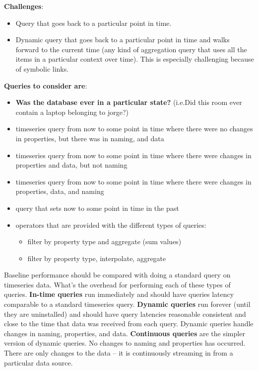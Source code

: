 {\bf Challenges}:
\begin{itemize}
\item Query that goes back to a particular point in time.
\item Dynamic query that goes back to a particular point in time and walks forward to the current time (any kind of aggregation
query that uses all the items in a particular context over time).  This is especially challenging because of symbolic links.\\
\end{itemize}


{\bf Queries to consider are}:
\begin{itemize}

\item {\bf Was the database ever in a particular state?} (i.e.Did this room ever contain a laptop belonging to jorge?)
\item timeseries query from now to some point in time where there were no changes in properties, but there was in naming, and data
\item timeseries query from now to some point in time where there were changes in properties and data, but not naming
\item timeseries query from now to some point in time where there were changes in properties, data, and naming
\item query that sets now to some point in time in the past
\item operators that are provided with the different types of queries:
	\begin{itemize}
	\item filter by property type and aggregate (sum values)
	\item filter by property type, interpolate, aggregate\\
	\end{itemize}
\end{itemize}

Baseline performance should be compared with doing a standard query on timeseries data.  What's the overhead for performing
each of these types of queries.  {\bf In-time queries} run immediately and should have queries latency comparable to a standard
timeseries query.  {\bf Dynamic queries} run forever (until they are uninstalled) and should have query latencies reasonable consistent
and close to the time that data was received from each query.  Dynamic queries handle changes in naming, properties, and data.
{\bf Continuous queries} are the simpler version of dynamic queries.  No changes to naming and properties has occurred.  There are 
only changes to the data -- it is continuously streaming in from a particular data source.

